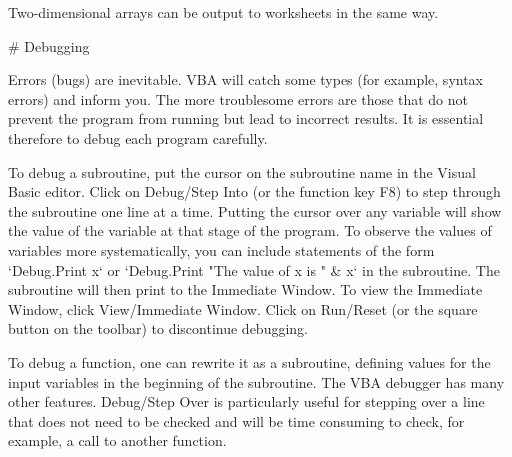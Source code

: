 Two-dimensional arrays can be output to worksheets in the same way.  

 
 
 # Debugging

Errors (bugs) are inevitable.  VBA will catch some types (for example, syntax errors) and inform you.  The more troublesome errors are those that do not prevent the program from running but lead to incorrect results.  It is essential therefore to debug each program carefully.  

To debug a subroutine, put the cursor on the subroutine name in the
Visual Basic editor. Click on Debug/Step Into (or the function key F8)
to step through the subroutine one line at a time. Putting the cursor
over any variable will show the value of the variable at that stage of
the program. To observe the values of variables more systematically, you
can include statements of the form `Debug.Print x` or
`Debug.Print "The value of x is " & x` in the subroutine. The subroutine
will then print to the Immediate Window. To view the Immediate Window,
click View/Immediate Window. Click on Run/Reset (or the square button on
the toolbar) to discontinue debugging.

To debug a function, one can rewrite it as a subroutine, defining values for the input variables in the beginning of the subroutine.  
The VBA debugger has many other features.  Debug/Step Over is particularly useful for stepping over a line that does not need to be checked and will be time consuming to check, for example, a call to another function.